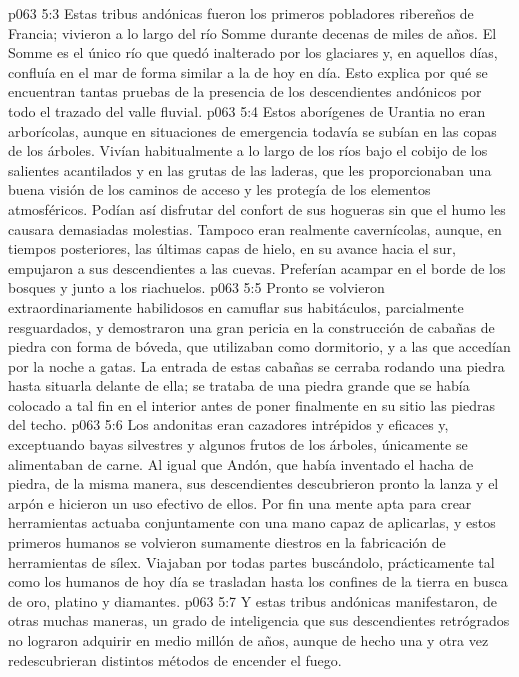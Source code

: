 \vs p063 5:3 Estas tribus andónicas fueron los primeros pobladores ribereños de Francia; vivieron a lo largo del río Somme durante decenas de miles de años. El Somme es el único río que quedó inalterado por los glaciares y, en aquellos días, confluía en el mar de forma similar a la de hoy en día. Esto explica por qué se encuentran tantas pruebas de la presencia de los descendientes andónicos por todo el trazado del valle fluvial.
\vs p063 5:4 Estos aborígenes de Urantia no eran arborícolas, aunque en situaciones de emergencia todavía se subían en las copas de los árboles. Vivían habitualmente a lo largo de los ríos bajo el cobijo de los salientes acantilados y en las grutas de las laderas, que les proporcionaban una buena visión de los caminos de acceso y les protegía de los elementos atmosféricos. Podían así disfrutar del confort de sus hogueras sin que el humo les causara demasiadas molestias. Tampoco eran realmente cavernícolas, aunque, en tiempos posteriores, las últimas capas de hielo, en su avance hacia el sur, empujaron a sus descendientes a las cuevas. Preferían acampar en el borde de los bosques y junto a los riachuelos.
\vs p063 5:5 Pronto se volvieron extraordinariamente habilidosos en camuflar sus habitáculos, parcialmente resguardados, y demostraron una gran pericia en la construcción de cabañas de piedra con forma de bóveda, que utilizaban como dormitorio, y a las que accedían por la noche a gatas. La entrada de estas cabañas se cerraba rodando una piedra hasta situarla delante de ella; se trataba de una piedra grande que se había colocado a tal fin en el interior antes de poner finalmente en su sitio las piedras del techo.
\vs p063 5:6 Los andonitas eran cazadores intrépidos y eficaces y, exceptuando bayas silvestres y algunos frutos de los árboles, únicamente se alimentaban de carne. Al igual que Andón, que había inventado el hacha de piedra, de la misma manera, sus descendientes descubrieron pronto la lanza y el arpón e hicieron un uso efectivo de ellos. Por fin una mente apta para crear herramientas actuaba conjuntamente con una mano capaz de aplicarlas, y estos primeros humanos se volvieron sumamente diestros en la fabricación de herramientas de sílex. Viajaban por todas partes buscándolo, prácticamente tal como los humanos de hoy día se trasladan hasta los confines de la tierra en busca de oro, platino y diamantes.
\vs p063 5:7 Y estas tribus andónicas manifestaron, de otras muchas maneras, un grado de inteligencia que sus descendientes retrógrados no lograron adquirir en medio millón de años, aunque de hecho una y otra vez redescubrieran distintos métodos de encender el fuego.
